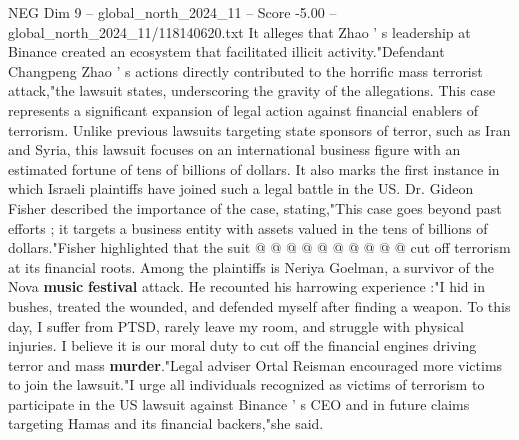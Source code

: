 \begin{textsample}{NEG Dim 9 – global\_north\_2024\_11 – Score -5.00 – global\_north\_2024\_11/118140620.txt}
It alleges that Zhao ' s leadership at Binance created an ecosystem that facilitated illicit activity."Defendant Changpeng Zhao ' s actions directly contributed to the horrific mass terrorist attack,"the lawsuit states, underscoring the gravity of the allegations.
This case represents a significant expansion of legal action against financial enablers of terrorism.
Unlike previous lawsuits targeting state sponsors of terror, such as Iran and Syria, this lawsuit focuses on an international business figure with an estimated fortune of tens of billions of dollars.
It also marks the first instance in which Israeli plaintiffs have joined such a legal battle in the US.
Dr.
Gideon Fisher described the importance of the case, stating,"This case goes beyond past efforts ; it targets a business entity with assets valued in the tens of billions of dollars."Fisher highlighted that the suit @ @ @ @ @ @ @ @ @ @ cut off terrorism at its financial roots.
Among the plaintiffs is Neriya Goelman, a survivor of the Nova \textbf{music} \textbf{festival} attack.
He recounted his harrowing experience :"I hid in bushes, treated the wounded, and defended myself after finding a weapon.
To this day, I suffer from PTSD, rarely leave my room, and struggle with physical injuries.
I believe it is our moral duty to cut off the financial engines driving terror and mass \textbf{murder}."Legal adviser Ortal Reisman encouraged more victims to join the lawsuit."I urge all individuals recognized as victims of terrorism to participate in the US lawsuit against Binance ' s CEO and in future claims targeting Hamas and its financial backers,"she said.

\end{textsample}
